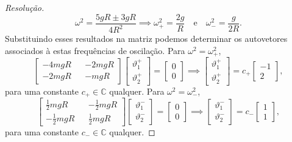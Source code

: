\begin{proof}[Resolução]
    \begin{equation*}
        \omega^2 = \frac{5gR \pm 3gR}{4R^2} \implies \omega_+^2 = \frac{2g}{R}\quad\text{e}\quad\omega_-^2 = \frac{g}{2R}.
    \end{equation*}
    Substituindo esses resultados na matriz podemos determinar os autovetores associados à estas frequências de oscilação. Para \(\omega^2 = \omega_+^2\),
    \begin{equation*}
       \begin{bmatrix}
           -4mgR && -2mgR\\
           -2mgR && -mgR
       \end{bmatrix}
       \begin{bmatrix}
           \vartheta^+_1\\\vartheta^+_2
       \end{bmatrix}
       =
       \begin{bmatrix}
           0\\0
       \end{bmatrix}
       \implies
       \begin{bmatrix}
           \vartheta^+_1\\\vartheta^+_2
       \end{bmatrix}
       =
       c_+\begin{bmatrix}
           -1\\2
       \end{bmatrix},
    \end{equation*}
    para uma constante \(c_+ \in \mathbb{C}\) qualquer. Para \(\omega^2 = \omega_-^2\),
    \begin{equation*}
       \begin{bmatrix}
           \frac12mgR && -\frac12mgR\\
           -\frac12mgR && \frac12mgR
       \end{bmatrix}
       \begin{bmatrix}
           \vartheta^-_1\\\vartheta^-_2
       \end{bmatrix}
       =
       \begin{bmatrix}
           0\\0
       \end{bmatrix}
       \implies
       \begin{bmatrix}
           \vartheta^-_1\\\vartheta^-_2
       \end{bmatrix}
       =
       c_-\begin{bmatrix}
           1\\1
       \end{bmatrix},
    \end{equation*}
    para uma constante \(c_- \in \mathbb{C}\) qualquer.


\end{proof}

